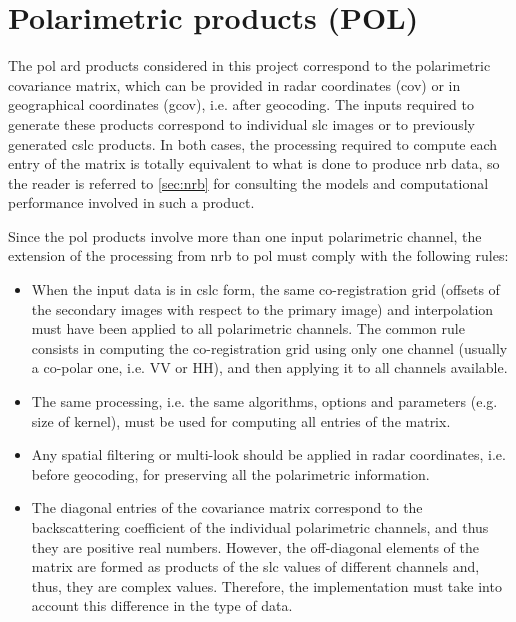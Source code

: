 \section{Polarimetric products (POL)}
\label{sec:pol}

The \acs{pol} \acs{ard} products considered in this project correspond to the polarimetric covariance matrix, which can be provided in radar coordinates (\acs{cov}) or in geographical coordinates (\acs{gcov}), i.e. after geocoding. The inputs required to generate these products correspond to individual \acs{slc} images or to previously generated \acs{cslc} products. In both cases, the processing required to compute each entry of the matrix is totally equivalent to what is done to produce \acs{nrb} data, so the reader is referred to \autoref{sec:nrb} for consulting the models and computational performance involved in such a product.

Since the \acs{pol} products involve more than one input polarimetric channel, the extension of the processing from \acs{nrb} to \acs{pol} must comply with the following rules:
\begin{itemize}
    \item When the input data is in \acs{cslc} form, the same co-registration grid (offsets of the secondary images with respect to the primary image) and interpolation must have been applied to all polarimetric channels. The common rule consists in computing the co-registration grid using only one channel (usually a co-polar one, i.e. VV or HH), and then applying it to all channels available.
    \item The same processing, i.e. the same algorithms, options and parameters (e.g. size of kernel), must be used for computing all entries of the matrix.
    \item Any spatial filtering or multi-look should be applied in radar coordinates, i.e. before geocoding, for preserving all the polarimetric information.
    \item The diagonal entries of the covariance matrix correspond to the backscattering coefficient of the individual polarimetric channels, and thus they are positive real numbers. However, the off-diagonal elements of the matrix are formed as products of the \acs{slc} values of different channels and, thus, they are complex values. Therefore, the implementation must take into account this difference in the type of data. 
\end{itemize}

